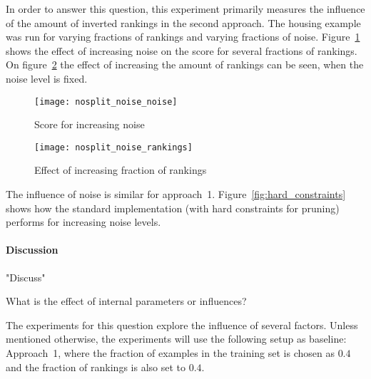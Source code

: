 \begin{experiment}
	In order to answer this question, this experiment primarily measures the influence of the amount of inverted rankings in the second approach.
	The housing example was run for varying fractions of rankings and varying fractions of noise.
	Figure~\ref{fig:nosplit_noise_noise} shows the effect of increasing noise on the score for several fractions of rankings.
	On figure~\ref{fig:nosplit_noise_rankings} the effect of increasing the amount of rankings can be seen, when the noise level is fixed.

	\begin{figure}

		\caption{Score for increasing noise}
		\centering
			\texttt{[image: nosplit\_noise\_noise]}
		\label{fig:nosplit_noise_noise}

	\end{figure}

	\begin{figure}

		\caption{Effect of increasing fraction of rankings}
		\centering
			\texttt{[image: nosplit\_noise\_rankings]}
		\label{fig:nosplit_noise_rankings}

	\end{figure}

\end{experiment}

\begin{experiment}
	
	The influence of noise is similar for approach~1.
	Figure~\ref{fig:hard_constraints} shows how the standard implementation (with hard constraints for pruning) performs for increasing noise levels.

\end{experiment}

\paragraph{Discussion}
"Discuss"

\begin{question}
	What is the effect of internal parameters or influences?
\end{question}

The experiments for this question explore the influence of several factors.
Unless mentioned otherwise, the experiments will use the following setup as baseline:
Approach~1, where the fraction of examples in the training set is chosen as $0.4$ and the fraction of rankings is also set to $0.4$.

